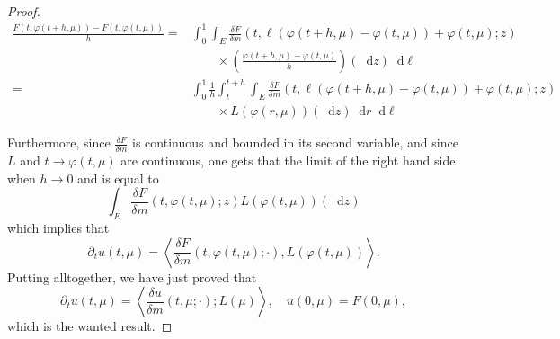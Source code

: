 \documentclass[a4paper,11pt, reqno]{amsart}
\newcommand{\dd}{\mathop{}\!\mathrm{d}}
\newcommand{\1}{\mathbbm{1}}
\theoremstyle{plain}
\theoremstyle{definition}
\begin{document}
\begin{proof}
  \begin{align*}
    \frac{F (t, \varphi (t + h, \mu)) - F (t, \varphi (t, \mu))}{h} = &
    \int_0^1 \int_E \frac{\delta F}{\delta m} (t, \ell (\varphi (t + h, \mu) -
    \varphi (t, \mu)) + \varphi (t, \mu) ; z)\\
    & \qquad \times \left( \frac{\varphi (t + h, \mu) - \varphi (t, \mu)}{h}
    \right) (\dd z) \dd \ell\\
    = & \int_0^1 \frac{1}{h} \int_t^{t + h} \int_E \frac{\delta F}{\delta m}
    (t, \ell (\varphi (t + h, \mu) - \varphi (t, \mu)) + \varphi (t, \mu) ;
    z)\\
    & \qquad \times L (\varphi (r, \mu)) (\dd z) \dd r \dd \ell
  \end{align*}
  
  Furthermore, since $\frac{\delta F}{\delta m}$ is continuous and bounded in
  its second variable, and since $L$ and $t \rightarrow \varphi (t, \mu)$ are
  continuous, one gets that the limit of the right hand side when $h
  \rightarrow 0$ and is equal to
  \[ \int_E \frac{\delta F}{\delta m} (t, \varphi (t, \mu) ; z) L (\varphi (t,
     \mu)) (\dd z) \]
  which implies that
  \[ \partial_t u (t, \mu) = \left\langle \frac{\delta F}{\delta m} (t,
     \varphi (t, \mu) ; \cdot), L (\varphi (t, \mu)) \right\rangle . \]
  Putting alltogether, we have just proved that
  \[ \partial_t u (t, \mu) = \left\langle \frac{\delta u}{\delta m} (t, \mu ;
     \cdot) ; L (\mu) \right\rangle, \quad u (0, \mu) = F (0 , \mu), \]
  which is the wanted result.
\end{proof}
\end{document}

